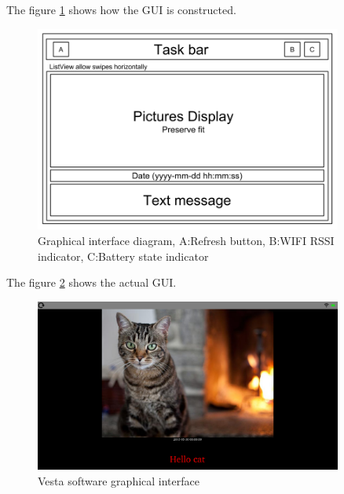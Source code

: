 The figure \ref{fig:gui diagram} shows how the GUI is constructed.

\begin{figure}[!htb]
    \centering
    \includegraphics[width=0.9\textwidth,keepaspectratio]{chap/softFig/GUI_diagram}
    \caption{Graphical interface diagram, A:Refresh button, B:WIFI RSSI indicator, C:Battery state indicator}
    \label{fig:gui diagram}
\end{figure}

The figure \ref{fig:graphical interface} shows the actual GUI.

\begin{figure}[!htb]
    \centering
    \includegraphics[width=0.9\textwidth,keepaspectratio]{chap/softFig/vesta_printscreen}
    \caption{Vesta software graphical interface}
    \label{fig:graphical interface}
\end{figure}


